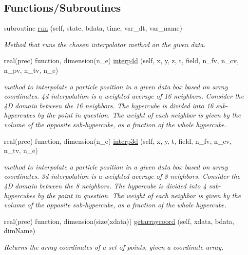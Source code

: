 \subsection*{Functions/\+Subroutines}
\begin{DoxyCompactItemize}
\item 
subroutine \mbox{\hyperlink{namespaceinterpolator__mod_a53b61f6bca0d966521c68cb3ca838d93}{run}} (self, state, bdata, time, var\+\_\+dt, var\+\_\+name)
\begin{DoxyCompactList}\small\item\em Method that runs the chosen interpolator method on the given data. \end{DoxyCompactList}\item 
real(prec) function, dimension(n\+\_\+e) \mbox{\hyperlink{namespaceinterpolator__mod_ac54a92d43721099e8e5bc5a888d7ee73}{interp4d}} (self, x, y, z, t, field, n\+\_\+fv, n\+\_\+cv, n\+\_\+pv, n\+\_\+tv, n\+\_\+e)
\begin{DoxyCompactList}\small\item\em method to interpolate a particle position in a given data box based on array coordinates. 4d interpolation is a weighted average of 16 neighbors. Consider the 4D domain between the 16 neighbors. The hypercube is divided into 16 sub-\/hypercubes by the point in question. The weight of each neighbor is given by the volume of the opposite sub-\/hypercube, as a fraction of the whole hypercube. \end{DoxyCompactList}\item 
real(prec) function, dimension(n\+\_\+e) \mbox{\hyperlink{namespaceinterpolator__mod_adcd5e67fbafc57180f69bfafa64377dc}{interp3d}} (self, x, y, t, field, n\+\_\+fv, n\+\_\+cv, n\+\_\+tv, n\+\_\+e)
\begin{DoxyCompactList}\small\item\em method to interpolate a particle position in a given data box based on array coordinates. 3d interpolation is a weighted average of 8 neighbors. Consider the 4D domain between the 8 neighbors. The hypercube is divided into 4 sub-\/hypercubes by the point in question. The weight of each neighbor is given by the volume of the opposite sub-\/hypercube, as a fraction of the whole hypercube. \end{DoxyCompactList}\item 
real(prec) function, dimension(size(xdata)) \mbox{\hyperlink{namespaceinterpolator__mod_a8a01c7e0b55ffb05a24c08ab97b4a6a1}{getarraycoord}} (self, xdata, bdata, dim\+Name)
\begin{DoxyCompactList}\small\item\em Returns the array coordinates of a set of points, given a coordinate array. \end{DoxyCompactList}\item 

\end{DoxyCompactItemize}
